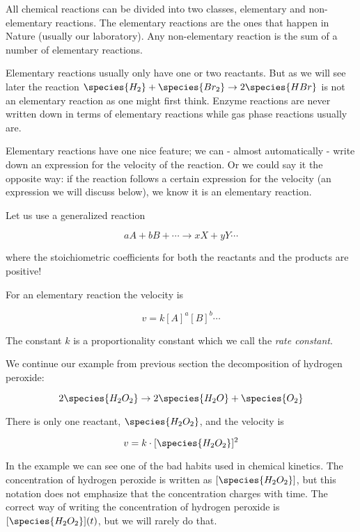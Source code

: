All chemical reactions can be divided into two classes, elementary and non-elementary reactions. The elementary reactions are the ones that happen in Nature (usually our laboratory). Any non-elementary reaction is the sum of a number of elementary reactions.

Elementary reactions usually only have one or two reactants. But as we will see later the reaction $\species{H_2} + \species{Br_2} \rightarrow 2\species{HBr}$ is not an elementary reaction as one might first think. Enzyme reactions are never written down in terms of elementary reactions while gas phase reactions usually are.

Elementary reactions have one nice feature; we can - almost automatically - write down an expression for the velocity of the reaction. Or we could say it the opposite way: if the reaction follows a certain expression for the velocity (an expression we will discuss below), we know it is an elementary reaction.

Let us use a generalized reaction \ie

\[
  aA + bB + \cdots \rightarrow xX + yY \cdots
\]

where the stoichiometric coefficients for both the reactants and the products are positive!

For an elementary reaction the velocity is

\begin{equation}
  \label{eq:elementaryReaction}
  v = k[A]^a[B]^b\cdots
\end{equation}

The constant $k$ is a proportionality constant which we call the \textit{rate constant}.

\begin{example}
  We continue our example from previous section \ie the decomposition of hydrogen peroxide:

  \begin{equation}
    \label{eq:decompH2O2}
    2\species{H_2O_2} \rightarrow 2\species{H_2O} + \species{O_2}
  \end{equation}

  There is only one reactant, $\species{H_2O_2}$, and the velocity is

  \begin{equation}
    \label{eq:decompH2O2velocity}
    v = k\cdot [\species{H_2O_2}]^2
  \end{equation}
\end{example}

In the example we can see one of the bad habits used in chemical kinetics. The concentration of hydrogen peroxide is written as $[\species{H_2O_2}]$, but this notation does not emphasize that the concentration charges with time. The correct way of writing the concentration of hydrogen peroxide is $[\species{H_2O_2}](t)$, but we will rarely do that.


